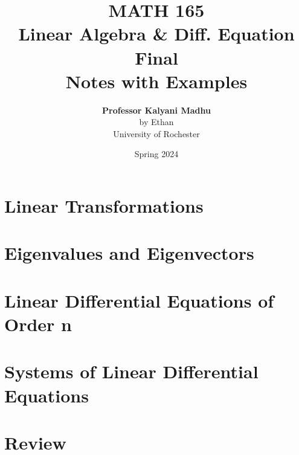 \documentclass[oneside]{book}
\def\notetitle{MATH 165\\Linear Algebra \& Diff. Equation\\Final \\Notes with Examples}
\def\noteauthor{
    \textbf{Professor Kalyani Madhu} \\ 
    by Ethan\\
    University of Rochester}
\def\notedate{Spring 2024}
\begin{document}
\title{\textbf{
    \LARGE{\notetitle} \vspace*{10\baselineskip}}
    }
\author{\noteauthor}
\date{\notedate}

\maketitle
\newpage

\tableofcontents
\newpage

\chapter{Linear Transformations}


\chapter{Eigenvalues and Eigenvectors}




\chapter{Linear Differential Equations of Order n}




\chapter{Systems of Linear Differential Equations}




\chapter{Review}

\end{document}
